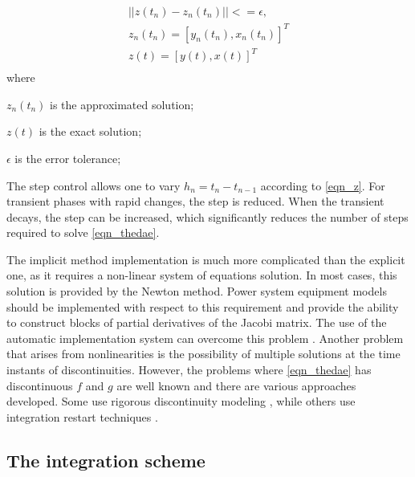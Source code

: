 \documentclass[lettersize,journal]{IEEEtran}
\begin{document}
\begin{equation}
	\label{eqn_z}
	\begin{array}{c}
		\vert\vert z(t_n)-z_n(t_n) \vert\vert <= \epsilon, \\
		z_n(t_n)=[y_n(t_n), x_n(t_n)]^T	 \\
		z(t)=[y(t), x(t)]^T \\
	\end{array}
\end{equation}
\noindent where
\begin{description}
	\item  \(z_n(t_n)\) is the approximated solution;
	\item  \(z(t)\) is the exact solution;
	\item  \(\epsilon\) is the error tolerance;
\end{description}

The step control allows one to vary \(h_{n}=t_{n}-t_{n-1}\) according to \eqref{eqn_z}. For transient phases with rapid changes, the step is reduced. When the transient decays, the step can be increased, which significantly reduces the number of steps required to solve \eqref{eqn_thedae}.

The implicit method implementation is much more complicated than the explicit one, as it requires a non-linear system of equations solution. In most cases, this solution is provided by the Newton method. Power system equipment models should be implemented with respect to this requirement and provide the ability to construct blocks of partial derivatives of the Jacobi matrix. The use of the automatic implementation system can overcome this problem \cite{mycompiler}. Another problem that arises from nonlinearities is the possibility of multiple solutions at the time instants of discontinuities. However, the problems where \eqref{eqn_thedae} has discontinuous \(f\) and \(g\) are well known and there are various approaches developed. Some use rigorous discontinuity modeling \cite{Filippov1988}, while others use integration restart techniques \cite{cellier06}.

\subsection{The integration scheme}
\end{document}
